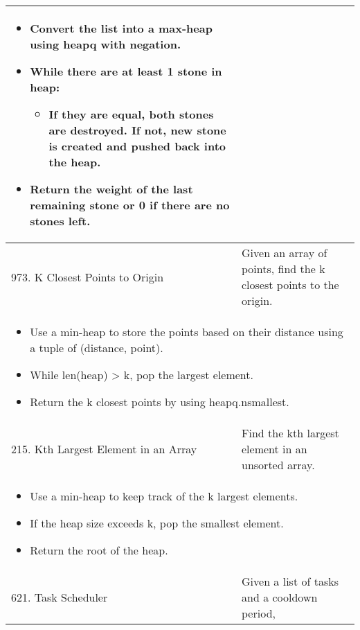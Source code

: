 \begin{summary}
\begin{center}
\begin{tabular}{ll}
{                    \begin{itemize}
                        \item Convert the list into a max-heap using heapq with negation. 
                        \item While there are at least 1 stone in heap:
                        \begin{itemize}
                            \item If they are equal, both stones are destroyed. If not, new stone is created and pushed back into the heap.
                        \end{itemize}
                        \item Return the weight of the last remaining stone or 0 if there are no stones left.
                    \end{itemize}
                } \\
            \midrule
            973. K Closest Points to Origin & Given an array of points, find the k closest points to the origin. \\
            \multicolumn{2}{p{\linewidth}}{
                    \begin{itemize}
                        \item Use a min-heap to store the points based on their distance using a tuple of (distance, point).
                        \item While len(heap) > k, pop the largest element.
                        \item Return the k closest points by using heapq.nsmallest.
                    \end{itemize}
                } \\
            \midrule
            215. Kth Largest Element in an Array & Find the kth largest element in an unsorted array. \\
            \multicolumn{2}{p{\linewidth}}{
                    \begin{itemize}
                        \item Use a min-heap to keep track of the k largest elements.
                        \item If the heap size exceeds k, pop the smallest element.
                        \item Return the root of the heap.
                    \end{itemize}
                } \\
            \midrule
            621. Task Scheduler & Given a list of tasks and a cooldown period, \\

\end{tabular}
\end{center}
\end{summary}
